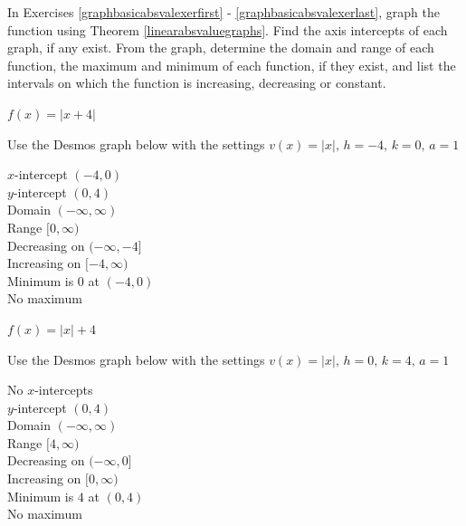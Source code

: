 \documentclass{ximera}
\begin{document}
	\author{Stitz-Zeager}


\begin{question}
In Exercises \ref{graphbasicabsvalexerfirst} - \ref{graphbasicabsvalexerlast}, graph the function using Theorem \ref{linearabsvaluegraphs}. Find the axis intercepts of each graph, if any exist.  From the graph, determine the domain and range of each function, the maximum and minimum of each function, if they exist, and list the intervals on which the function is increasing, decreasing or constant.

\begin{problem}\label{graphbasicabsvalexerfirst}
$f(x) = |x + 4|$

\begin{solution}
Use the Desmos graph below with the settings $v(x)=|x|,\,h=-4,\,k=0,\,a=1$

\begin{center} 
\end{center}

$x$-intercept $(-4, 0)$ \\ $y$-intercept $(0, 4)$ \\ Domain $(-\infty, \infty)$ \\ Range $[0, \infty)$ \\ Decreasing on $(-\infty, -4]$ \\ Increasing on $[-4, \infty)$ \\ Minimum is $0$ at $(-4,0)$ \\ No maximum\\

\end{solution}

\end{problem}

\begin{problem}
$f(x) = |x| + 4$

\begin{solution}
Use the Desmos graph below with the settings $v(x)=|x|,\,h=0,\,k=4,\,a=1$

\begin{center} 
\end{center}

No $x$-intercepts \\ $y$-intercept $(0, 4)$ \\ Domain $(-\infty, \infty)$ \\ Range $[4, \infty)$ \\ Decreasing on $(-\infty, 0]$ \\ Increasing on $[0, \infty)$ \\  Minimum is $4$ at $(0,4)$  \\ No maximum \\


\end{solution}
\end{problem}
\end{question}
\end{document}
